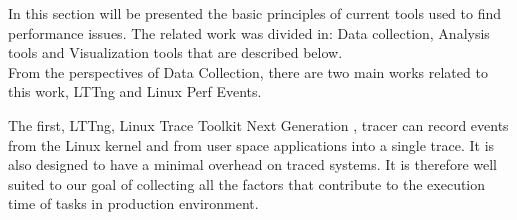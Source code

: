 
In this section will be presented the basic principles of current tools used to find performance issues. The related work was divided in: Data collection, Analysis tools and Visualization tools that are described below.\\

From the perspectives of Data Collection, there are two main works related to this work, LTTng and Linux Perf Events.

The first, LTTng, Linux Trace Toolkit Next Generation \cite{desnoyers}, tracer can record events from the Linux kernel and from user space applications into a single trace. It is also designed to have a minimal overhead on traced systems. It is therefore well suited to our goal of collecting all the factors that contribute to the execution time of tasks in production environment.\\

